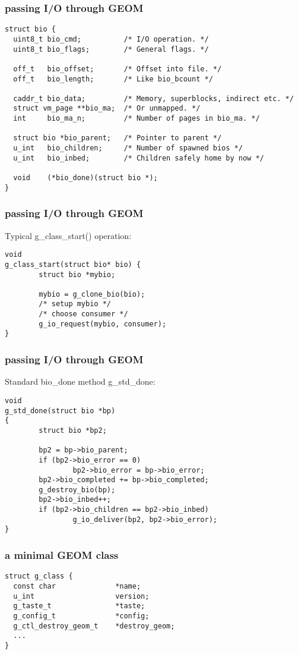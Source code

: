 \documentclass{beamer}
\begin{document}
\begin{frame}[fragile]
\frametitle{passing I/O through GEOM}
\small\begin{verbatim}
struct bio {
  uint8_t bio_cmd;          /* I/O operation. */
  uint8_t bio_flags;        /* General flags. */

  off_t   bio_offset;       /* Offset into file. */
  off_t   bio_length;       /* Like bio_bcount */

  caddr_t bio_data;         /* Memory, superblocks, indirect etc. */
  struct vm_page **bio_ma;  /* Or unmapped. */
  int     bio_ma_n;         /* Number of pages in bio_ma. */

  struct bio *bio_parent;   /* Pointer to parent */
  u_int   bio_children;     /* Number of spawned bios */
  u_int   bio_inbed;        /* Children safely home by now */

  void    (*bio_done)(struct bio *);
}
\end{verbatim}
\end{frame}


\begin{frame}[fragile]
\frametitle{passing I/O through GEOM}
Typical g\_class\_start() operation:
\small\begin{verbatim}
void
g_class_start(struct bio* bio) {
        struct bio *mybio;

        mybio = g_clone_bio(bio);
        /* setup mybio */
        /* choose consumer */
        g_io_request(mybio, consumer);
}
\end{verbatim}
\end{frame}


\begin{frame}[fragile]
\frametitle{passing I/O through GEOM}
Standard bio\_done method g\_std\_done:
\small\begin{verbatim}
void
g_std_done(struct bio *bp)
{
        struct bio *bp2;
 
        bp2 = bp->bio_parent;
        if (bp2->bio_error == 0)
                bp2->bio_error = bp->bio_error;
        bp2->bio_completed += bp->bio_completed;
        g_destroy_bio(bp);
        bp2->bio_inbed++;
        if (bp2->bio_children == bp2->bio_inbed)
                g_io_deliver(bp2, bp2->bio_error);
}
\end{verbatim}
\end{frame}


\begin{frame}[fragile]
\frametitle{a minimal GEOM class}
\small\begin{verbatim}
struct g_class {
  const char              *name;
  u_int                   version;
  g_taste_t               *taste;
  g_config_t              *config;
  g_ctl_destroy_geom_t    *destroy_geom;
  ...
}
\end{verbatim}
\end{frame}
\end{document}
